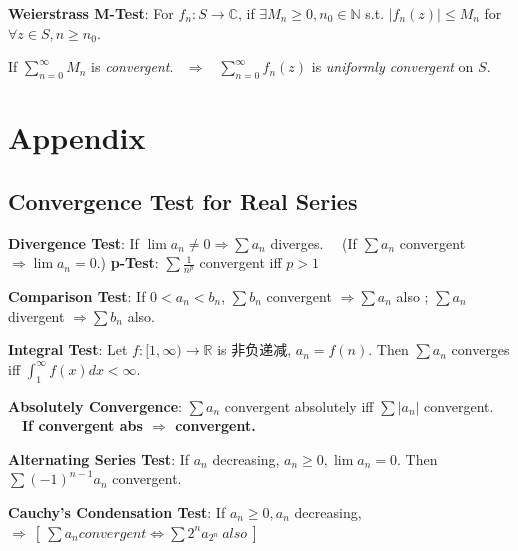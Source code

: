 \documentclass[9pt]{article}
\begin{document}
\textbf{Weierstrass M-Test}: For $f_n:S\to\mathbb{C}$, if $\exists M_n\geq 0,n_0\in\mathbb{N}$ s.t. $|f_n(z)|\leq M_n$ for $\forall z\in S,n\geq n_0$. 

\hspace{156pt}If $\sum^\infty_{n=0}M_n$ is \textit{convergent}. \ $\Rightarrow$ \ $\sum^\infty_{n=0}f_n(z)$ is \textit{uniformly convergent} on $S$.



\section{Appendix}

\subsection{Convergence Test for Real Series} %

\textbf{Divergence Test}: If $\lim a_n\ne 0 \Rightarrow \sum a_n$ diverges. \ \ (If $\sum a_n$ convergent $\Rightarrow \lim a_n=0.$) \qquad \textbf{p-Test}: $\sum \frac{1}{n^p}$ convergent iff $p>1$

\textbf{Comparison Test}: If $0<a_n<b_n$, $\sum b_n$ convergent $\Rightarrow \sum a_n$ also ; $\sum a_n$ divergent $\Rightarrow \sum b_n$ also.

\textbf{Integral Test}: Let $f:[1,\infty)\rightarrow\mathbb{R}$ is 非负递减, $a_n=f(n)$. Then $\sum a_n$ converges iff $\int_{1}^{\infty}f(x)dx<\infty.$

\textbf{Absolutely Convergence}: $\sum a_n$ convergent absolutely iff $\sum |a_n|$ convergent. \ \ \textbf{If convergent abs $\Rightarrow$ convergent.}

\textbf{Alternating Series Test}: If $a_n$ decreasing, $a_n\geq 0,\lim a_n = 0$. Then $\sum (-1)^{n-1}a_n$ convergent.

\textbf{Cauchy's Condensation Test}: If $a_n\geq 0,a_n$ decreasing, $\Rightarrow \ [\ \sum a_n convergent \Leftrightarrow \sum 2^na_{2^n} \ also \ ]$
\end{document}

